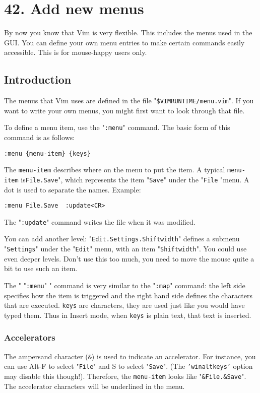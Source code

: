 \section{42. Add new menus}
By now you know that Vim is very flexible.
This includes the menus used in the GUI.
You can define your own menu entries to make certain commands easily accessible.
This is for mouse-happy users only.
\subsection{Introduction}
The menus that Vim uses are defined in the file "\texttt{\$VIMRUNTIME/menu.vim}".
If you want to write your own menus, you might first want to look through that file.

To define a menu item, use the "\texttt{:menu}" command.
The basic form of this command is as follows:

\begin{Verbatim}[samepage=true]
 :menu {menu-item} {keys}
\end{Verbatim}

The \texttt{{menu-item}} describes where on the menu to put the item.
A typical \texttt{{menu-item}} is\texttt{File.Save}", which represents the item "\texttt{Save}" under the "\texttt{File} "menu.
A dot is used to separate the names.
Example:

\begin{Verbatim}[samepage=true]
 :menu File.Save  :update<CR>
\end{Verbatim}

The "\texttt{:update}" command writes the file when it was modified.

You can add another level: "\texttt{Edit.Settings.Shiftwidth}" defines a submenu "\texttt{Settings}" under the "\texttt{Edit}" menu, with an item "\texttt{Shiftwidth}".
You could use even deeper levels.
Don't use this too much, you need to move the mouse quite a bit to use such an item.

The " "\texttt{:menu}" " command is very similar to the "\texttt{:map}" command: the left side specifies how the item is triggered and the right hand side defines the characters that are executed.
\texttt{{keys}} are characters, they are used just like you would have typed them.
Thus in Insert mode, when \texttt{{keys}} is plain text, that text is inserted.

\subsubsection{Accelerators}
The ampersand character (\texttt{\&}) is used to indicate an accelerator.
For instance, you can use Alt-F to select "\texttt{File}" and S to select "\texttt{Save}".
(The \texttt{'winaltkeys'} option may disable this though!).
Therefore, the \texttt{{menu-item}} looks like "\texttt{\&File.\&Save}".
The accelerator characters will be underlined in the menu.

